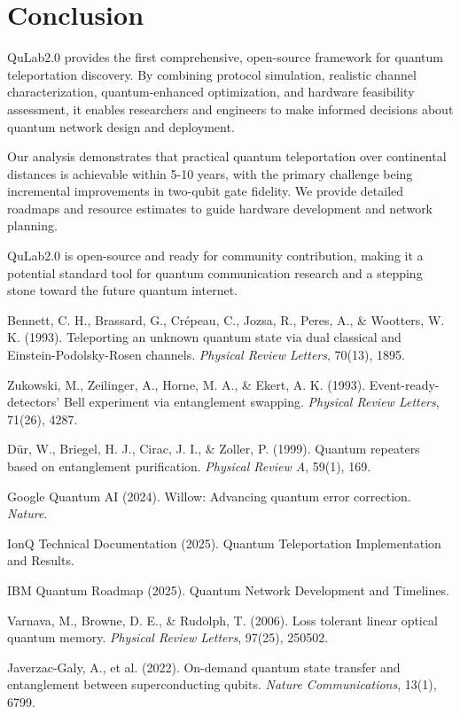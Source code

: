 \documentclass[11pt,a4paper]{article}
\begin{document}
\section{Conclusion}

QuLab2.0 provides the first comprehensive, open-source framework for quantum teleportation discovery. By combining protocol simulation, realistic channel characterization, quantum-enhanced optimization, and hardware feasibility assessment, it enables researchers and engineers to make informed decisions about quantum network design and deployment.

Our analysis demonstrates that practical quantum teleportation over continental distances is achievable within 5-10 years, with the primary challenge being incremental improvements in two-qubit gate fidelity. We provide detailed roadmaps and resource estimates to guide hardware development and network planning.

QuLab2.0 is open-source and ready for community contribution, making it a potential standard tool for quantum communication research and a stepping stone toward the future quantum internet.

\begin{thebibliography}{99}

 Bennett, C. H., Brassard, G., Crépeau, C., Jozsa, R., Peres, A., \& Wootters, W. K. (1993). Teleporting an unknown quantum state via dual classical and Einstein-Podolsky-Rosen channels. \textit{Physical Review Letters}, 70(13), 1895.

 Zukowski, M., Zeilinger, A., Horne, M. A., \& Ekert, A. K. (1993). Event-ready-detectors' Bell experiment via entanglement swapping. \textit{Physical Review Letters}, 71(26), 4287.

 Dür, W., Briegel, H. J., Cirac, J. I., \& Zoller, P. (1999). Quantum repeaters based on entanglement purification. \textit{Physical Review A}, 59(1), 169.

 Google Quantum AI (2024). Willow: Advancing quantum error correction. \textit{Nature}.

 IonQ Technical Documentation (2025). Quantum Teleportation Implementation and Results.

 IBM Quantum Roadmap (2025). Quantum Network Development and Timelines.

 Varnava, M., Browne, D. E., \& Rudolph, T. (2006). Loss tolerant linear optical quantum memory. \textit{Physical Review Letters}, 97(25), 250502.

 Javerzac-Galy, A., et al. (2022). On-demand quantum state transfer and entanglement between superconducting qubits. \textit{Nature Communications}, 13(1), 6799.

\end{thebibliography}
\end{document}
